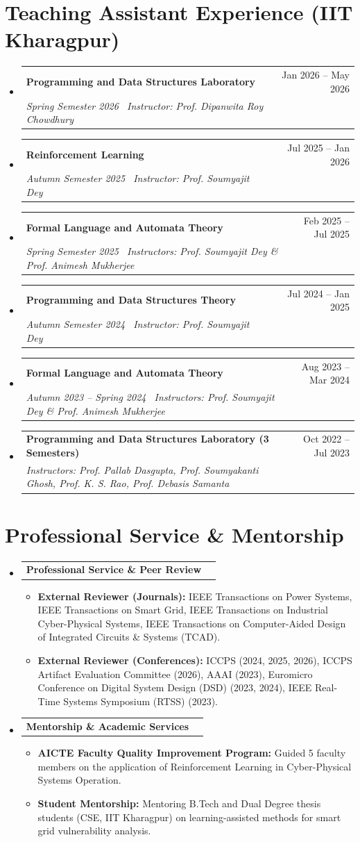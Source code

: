 \documentclass[letterpaper,11pt]{article}
\makeatletter
\newcommand{\resumeItem}[1]{
  \item\small{
    {#1 \vspace{-2pt}}
  }
}
\newcommand{\resumeSubheading}[4]{
  \vspace{-2pt}\item
    \begin{tabular*}{0.97\textwidth}[t]{l@{\extracolsep{\fill}}r}
      \textbf{#1} & #2 \\
      \textit{\small#3} & \textit{\small #4} \\
    \end{tabular*}\vspace{-7pt}
}
\newcommand{\resumeProjectHeading}[2]{
    \item
    \begin{tabular*}{0.97\textwidth}{l@{\extracolsep{\fill}}r}
      \small#1 & #2 \\
    \end{tabular*}\vspace{-7pt}
}
\newcommand{\resumeSubHeadingListStart}{\begin{itemize}[leftmargin=0.15in, label={}]}
\newcommand{\resumeSubHeadingListEnd}{\end{itemize}}
\newcommand{\resumeItemListStart}{\begin{itemize}}
\newcommand{\resumeItemListEnd}{\end{itemize}\vspace{-5pt}}
\makeatother
\begin{document}
\section{Teaching Assistant Experience (IIT Kharagpur)}
  \resumeSubHeadingListStart
    \resumeSubheading{Programming and Data Structures Laboratory}{Jan 2026 -- May 2026}{\textnormal{Spring Semester 2026 \textbar\ Instructor: Prof. Dipanwita Roy Chowdhury}}{}
    \resumeSubheading{Reinforcement Learning}{Jul 2025 -- Jan 2026}{\textnormal{Autumn Semester 2025 \textbar\ Instructor: Prof. Soumyajit Dey}}{}
    \resumeSubheading{Formal Language and Automata Theory}{Feb 2025 -- Jul 2025}{\textnormal{Spring Semester 2025 \textbar\ Instructors: Prof. Soumyajit Dey \& Prof. Animesh Mukherjee}}{}
    \resumeSubheading{Programming and Data Structures Theory}{Jul 2024 -- Jan 2025}{\textnormal{Autumn Semester 2024 \textbar\ Instructor: Prof. Soumyajit Dey}}{}
    \resumeSubheading{Formal Language and Automata Theory}{Aug 2023 -- Mar 2024}{\textnormal{Autumn 2023 – Spring 2024 \textbar\ Instructors: Prof. Soumyajit Dey \& Prof. Animesh Mukherjee}}{}
    \resumeSubheading{Programming and Data Structures Laboratory (3 Semesters)}{Oct 2022 -- Jul 2023}{\textnormal{Instructors: Prof. Pallab Dasgupta, Prof. Soumyakanti Ghosh, Prof. K. S. Rao, Prof. Debasis Samanta}}{}
  \resumeSubHeadingListEnd

\section{Professional Service \& Mentorship}
  \resumeSubHeadingListStart
    \resumeProjectHeading
        {\textbf{Professional Service \& Peer Review}}{}
        \resumeItemListStart
          \resumeItem{\textbf{External Reviewer (Journals):} IEEE Transactions on Power Systems, IEEE Transactions on Smart Grid, IEEE Transactions on Industrial Cyber-Physical Systems, IEEE Transactions on Computer-Aided Design of Integrated Circuits \& Systems (TCAD).}
          \resumeItem{\textbf{External Reviewer (Conferences):} ICCPS (2024, 2025, 2026), ICCPS Artifact Evaluation Committee (2026), AAAI (2023), Euromicro Conference on Digital System Design (DSD) (2023, 2024), IEEE Real-Time Systems Symposium (RTSS) (2023).}
        \resumeItemListEnd
    \resumeProjectHeading
        {\textbf{Mentorship \& Academic Services}}{}
        \resumeItemListStart
          \resumeItem{\textbf{AICTE Faculty Quality Improvement Program:} Guided 5 faculty members on the application of Reinforcement Learning in Cyber-Physical Systems Operation.}
          \resumeItem{\textbf{Student Mentorship:} Mentoring B.Tech and Dual Degree thesis students (CSE, IIT Kharagpur) on learning-assisted methods for smart grid vulnerability analysis.}
        \resumeItemListEnd
  \resumeSubHeadingListEnd
\end{document}
